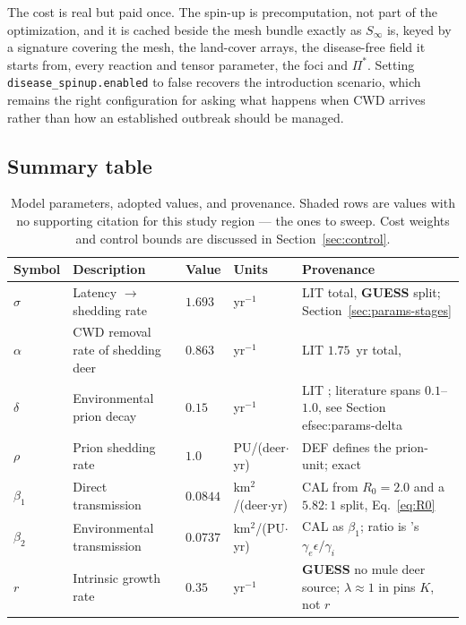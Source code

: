 \documentclass[11pt]{article}
\newcommand{\tagLIT}{{\footnotesize\textsf{\textcolor{green!40!black}{LIT}}}}
\newcommand{\tagDEF}{{\footnotesize\textsf{\textcolor{blue!60!black}{DEF}}}}
\newcommand{\tagCAL}{{\footnotesize\textsf{\textcolor{orange!75!black}{CAL}}}}
\newcommand{\tagGUESS}{{\footnotesize\textsf{\textbf{\textcolor{red!70!black}{GUESS}}}}}
\newcommand{\guessrow}{\rowcolor{guessbg}}
\begin{document}
The cost is real but paid once. The spin-up is precomputation, not part of the optimization, and it is cached beside the mesh bundle exactly as $S_\infty$ is, keyed by a signature covering the mesh, the land-cover arrays, the disease-free field it starts from, every reaction and tensor parameter, the foci and $\Pi^\ast$. Setting \texttt{disease\_spinup.enabled} to false recovers the introduction scenario, which remains the right configuration for asking what happens when CWD arrives rather than how an established outbreak should be managed.

\subsection{Summary table}

\begin{table}[h]
\centering
\small
\caption{Model parameters, adopted values, and provenance. Shaded rows are values with no supporting citation for this study region --- the ones to sweep. Cost weights and control bounds are discussed in Section~\ref{sec:control}.}
\label{tab:paramvalues}
\begin{tabular}{@{}llllp{4.6cm}@{}}
\toprule
Symbol & Description & Value & Units & Provenance \\
\midrule
$\sigma$ & Latency $\to$ shedding rate & $1.693$ & yr$^{-1}$ & \tagLIT{} total, \tagGUESS{} split; Section~\ref{sec:params-stages} \\
$\alpha$ & CWD removal rate of shedding deer & $0.863$ & yr$^{-1}$ & \tagLIT{} $1.75$~yr total, \citet{Miller2006,Geremia2015,Potapov2016} \\
$\delta$ & Environmental prion decay & $0.15$ & yr$^{-1}$ & \tagLIT{} \citet{Miller2006}; literature spans $0.1$--$1.0$, see Section~
ef{sec:params-delta} \\
$\rho$ & Prion shedding rate & $1.0$ & PU/(deer$\cdot$yr) & \tagDEF{} defines the prion-unit; exact \\
$\beta_1$ & Direct transmission & $0.0844$ & km$^2$/(deer$\cdot$yr) & \tagCAL{} from $R_0=2.0$ and a $5.82\!:\!1$ split, Eq.~\eqref{eq:R0} \\
$\beta_2$ & Environmental transmission & $0.0737$ & km$^2$/(PU$\cdot$yr) & \tagCAL{} as $\beta_1$; ratio is \citeauthor{Miller2006}'s $\gamma_e\epsilon/\gamma_i$ \\
\guessrow $r$ & Intrinsic growth rate & $0.35$ & yr$^{-1}$ & \tagGUESS{} no mule deer source; $\lambda\approx1$ in \citet{Geremia2015} pins $K$, not $r$ \\

\end{tabular}
\end{table}
\end{document}
